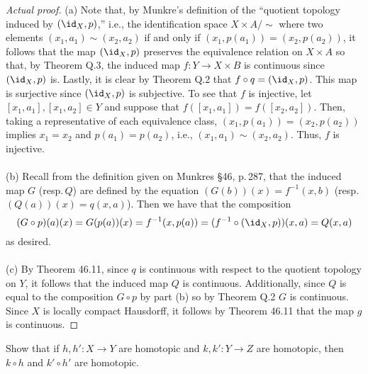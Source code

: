 \begin{proof}[Actual proof]
(a) Note that, by Munkre's definition of the ``quotient topology induced by
$(\id_X,p)$,'' i.e., the identification space $X\times A/{\sim}$ where two
elements $(x_1,a_1)\sim (x_2,a_2)$ if and only if
$(x_1,p(a_1))=(x_2,p(a_2))$, it follows that the map $(\id_X,p)$ preserves
the equivalence relation on $X\times A$ so that, by Theorem Q.3, the
induced map $f\colon Y\to X\times B$ is continuous since $(\id_X,p)$
is. Lastly, it is clear by Theorem Q.2 that $f\circ q=(\id_X,p)$. This map
is surjective since $(\id_X,p)$ is subjective. To see that $f$ is
injective, let $[x_1,a_1],[x_1,a_2]\in Y$ and suppose that
$f([x_1,a_1])=f([x_2,a_2])$. Then, taking a representative of each
equivalence class, $(x_1,p(a_1))=(x_2,p(a_2))$ implies $x_1=x_2$ and
$p(a_1)=p(a_2)$, i.e., $(x_1,a_1)\sim (x_2,a_2)$. Thus, $f$ is
injective.
\\\\
(b) Recall from the definition given on Munkres \S46, p.\,287,
that the induced map $G$ (resp.\,$Q$) are defined by the equation
$(G(b))(x)=f^{-1}(x,b)$ (resp.\,$(Q(a))(x)=q(x,a)$). Then we have
that the composition
\[
(G\circ p)(a)(x)=G(p(a))(x)=f^{-1}(x,p(a))=(f^{-1}\circ(\id_X,p))(x,a)=Q(x,a)
\]
as desired.
\\\\
(c) By Theorem 46.11, since $q$ is continuous with respect to the
quotient topology on $Y$, it follows that the induced map $Q$ is
continuous. Additionally, since $Q$ is equal to the composition
$G\circ p$ by part (b) so by Theorem Q.2 $G$ is continuous. Since
$X$ is locally compact Hausdorff, it follows by Theorem 46.11
that the map $g$ is continuous.
\end{proof}
\newpage
\begin{problem}[Munkres \S51, Ex.\,1]
Show that if $h,h'\colon X\to Y$ are homotopic and $k,k'\colon
Y\to Z$ are homotopic, then $k\circ h$ and $k'\circ h'$ are
homotopic.
\end{problem}
